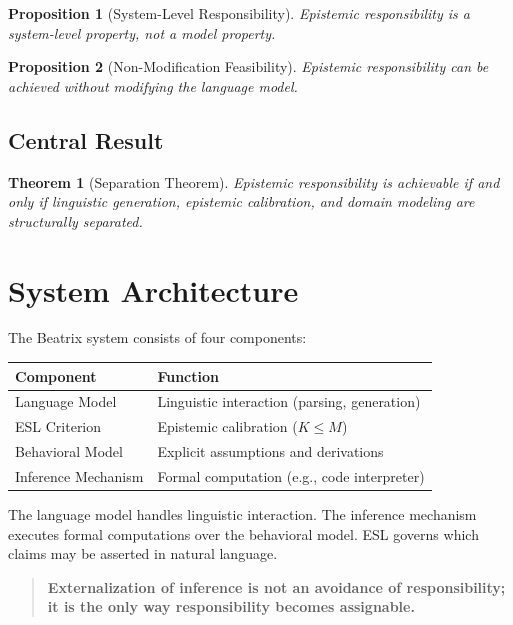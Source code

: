 \documentclass[11pt,a4paper]{article}
\newtheorem{proposition}{Proposition}[section]
\newtheorem{theorem}{Theorem}[section]
\begin{document}
\begin{proposition}[System-Level Responsibility]
Epistemic responsibility is a system-level property, not a model property.
\end{proposition}

\begin{proposition}[Non-Modification Feasibility]
Epistemic responsibility can be achieved without modifying the language model.
\end{proposition}

\subsection{Central Result}

\begin{theorem}[Separation Theorem]
Epistemic responsibility is achievable if and only if linguistic generation, epistemic calibration, and domain modeling are structurally separated.
\end{theorem}


\section{System Architecture}

The Beatrix system consists of four components:

\begin{center}
\begin{tabular}{ll}
\toprule
\textbf{Component} & \textbf{Function} \\
\midrule
Language Model & Linguistic interaction (parsing, generation) \\
ESL Criterion & Epistemic calibration ($K \le M$) \\
Behavioral Model & Explicit assumptions and derivations \\
Inference Mechanism & Formal computation (e.g., code interpreter) \\
\bottomrule
\end{tabular}
\end{center}

The language model handles linguistic interaction. The inference mechanism executes formal computations over the behavioral model. ESL governs which claims may be asserted in natural language.

\begin{quote}
\textbf{Externalization of inference is not an avoidance of responsibility; it is the only way responsibility becomes assignable.}
\end{quote}
\end{document}
